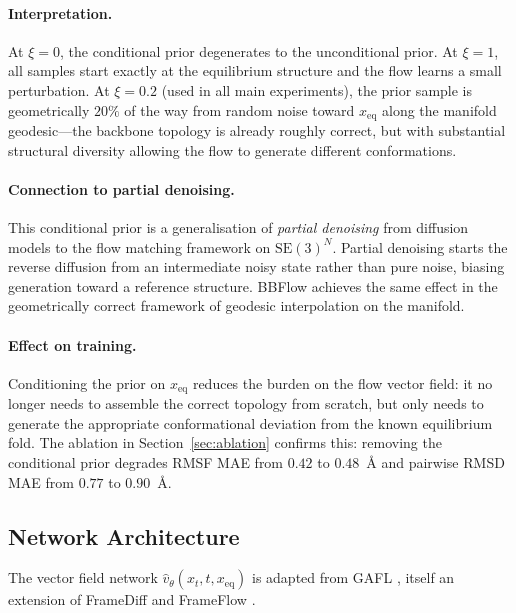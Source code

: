 \documentclass[12pt,a4paper]{article}
\newcommand{\xeq}{x_{\mathrm{eq}}}
\newcommand{\SE}{\mathrm{SE}(3)}
\newcommand{\vhat}{\hat{v}}
\begin{document}
\paragraph{Interpretation.}
At $\xi = 0$, the conditional prior degenerates to the unconditional prior.  At $\xi = 1$,
all samples start exactly at the equilibrium structure and the flow learns a small perturbation.
At $\xi = 0.2$ (used in all main experiments), the prior sample is geometrically $20\%$ of the
way from random noise toward $\xeq$ along the manifold geodesic---the backbone topology is
already roughly correct, but with substantial structural diversity allowing the flow to generate
different conformations.

\paragraph{Connection to partial denoising.}
This conditional prior is a generalisation of \emph{partial denoising} from diffusion models
\citep{lu2022str2str} to the flow matching framework on $\SE^N$.  Partial denoising starts
the reverse diffusion from an intermediate noisy state rather than pure noise, biasing
generation toward a reference structure.  BBFlow achieves the same effect in the geometrically
correct framework of geodesic interpolation on the manifold.

\paragraph{Effect on training.}
Conditioning the prior on $\xeq$ reduces the burden on the flow vector field: it no longer
needs to assemble the correct topology from scratch, but only needs to generate the appropriate
conformational deviation from the known equilibrium fold.  The ablation in Section~\ref{sec:ablation}
confirms this: removing the conditional prior degrades RMSF MAE from $0.42$ to $0.48$~Å
and pairwise RMSD MAE from $0.77$ to $0.90$~Å.

\subsection{Network Architecture}
\label{sec:architecture}

The vector field network $\vhat_\theta(x_t, t, \xeq)$ is adapted from GAFL
\citep{wagner2024gafl}, itself an extension of FrameDiff \citep{yim2023framediff} and
FrameFlow \citep{yim2023frameflow}.
\end{document}
